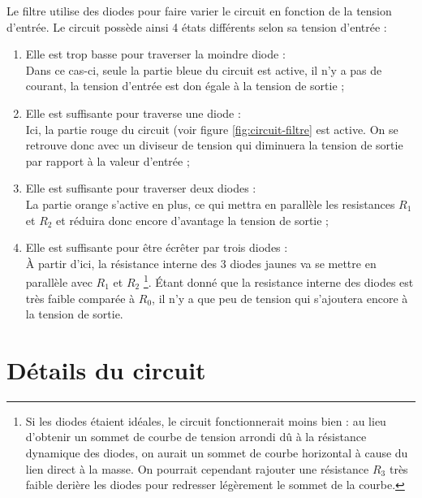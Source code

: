 Le filtre utilise des diodes pour faire varier le circuit en fonction de la tension d'entrée. 
Le circuit possède ainsi 4 états différents selon sa tension d'entrée :
\begin{enumerate}
	\item Elle est trop basse pour traverser la moindre diode :\\
				Dans ce cas-ci, seule la partie bleue du circuit est active, 
				il n'y a pas de courant, la tension d'entrée est don égale à
				la tension de sortie ;
	\item Elle est suffisante pour traverse une diode :\\
				Ici, la partie rouge du circuit (voir figure \ref{fig:circuit-filtre} est active. 
				On se retrouve donc avec un diviseur de tension qui diminuera la tension de sortie par rapport à la valeur d'entrée ;
	\item Elle est suffisante pour traverser deux diodes :\\
				La partie orange s'active en plus, ce qui mettra en parallèle les resistances $R_1$ et $R_2$ et
				réduira donc encore d'avantage la tension de sortie ;
	\item Elle est suffisante pour être écrêter par trois diodes :\\
				À partir d'ici, la résistance interne des 3 diodes jaunes va se mettre en parallèle avec $R_1$ et $R_2$
				\footnote{Si les diodes étaient idéales,
				le circuit fonctionnerait moins bien : au lieu d'obtenir un sommet de courbe de tension 
				arrondi dû à la résistance dynamique des diodes, on aurait un sommet de courbe
				horizontal à cause du lien direct à la masse. On pourrait cependant rajouter une résistance
				$R_3$ très faible derière les diodes pour redresser légèrement le sommet de la courbe.}. Étant donné que la 
				resistance interne des diodes est très faible comparée à $R_0$, il n'y a que peu de tension
				qui s'ajoutera encore à la tension de sortie.
\end{enumerate}

\section{Détails du circuit}

